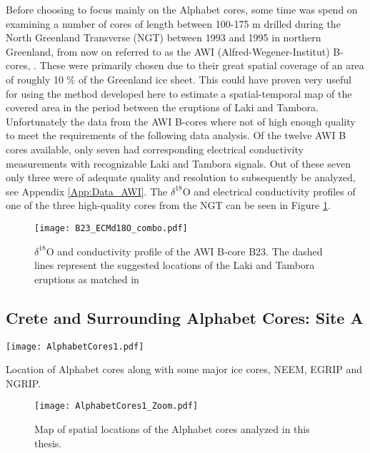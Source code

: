 \documentclass[../../CompleteThesis2/Complete_2ndDraft]{subfiles}
\begin{document}
Before choosing to focus mainly on the Alphabet cores, some time was spend on examining a number of cores of length between 100-175 m drilled during the North Greenland Transverse (NGT) between 1993 and 1995 in northern Greenland, from now on referred to as the AWI (Alfred-Wegener-Institut) B-cores, \cite[Weissbach et al. 2016]{Weissbach2016}. These were primarily chosen due to their great spatial coverage of an area of roughly 10 \% of the Greenland ice sheet. This could have proven very useful for using the method developed here to estimate a spatial-temporal map of the covered area in the period between the eruptions of Laki and Tambora. Unfortunately the data from the AWI B-cores where not of high enough quality to meet the requirements of the following data analysis. Of the twelve AWI B cores available, only seven had corresponding electrical conductivity measurements with recognizable Laki and Tambora signals. Out of these seven only three were of adequate quality and resolution to subsequently be analyzed, see Appendix \ref{App:Data_AWI}. The $\delta^{18}$O and electrical conductivity profiles of one of the three high-quality cores from the NGT can be seen in Figure \ref{fig:B23_ECMd18O_combo}.

\begin{figure}[h]
	\centering
	\texttt{[image: B23\_ECMd18O\_combo.pdf]}
	\caption[ECM and $\delta^{18}$O data between Laki and Tambora, Site B23.]{\small $\delta^{18}$O and conductivity profile of the AWI B-core B23. The dashed lines represent the suggested locations of the Laki and Tambora eruptions as matched in \cite[Weissbach et al. 2016]{Weissbach2016}}
	\label{fig:B23_ECMd18O_combo}
\end{figure}


\subsection[Crete Area][Crete Area]{Crete and Surrounding Alphabet Cores: Site A}
\label{Subsec:Data_Selection_Alhabet}
\begin{marginfigure}
	\centering
	\texttt{[image: AlphabetCores1.pdf]}
	\caption[]{\footnotesize Location of Alphabet cores along with some major ice cores, NEEM, EGRIP and NGRIP.}
	\label{Fig:AlphabetCoresMap}
\end{marginfigure}

\begin{figure}[!htb]
	\centering
	\texttt{[image: AlphabetCores1\_Zoom.pdf]}
	\caption[Alphabet Cores Map]{\small Map of spatial locations of the Alphabet cores analyzed in this thesis.}
	\label{Fig:MapAlphabetCores}
\end{figure}
\end{document}
